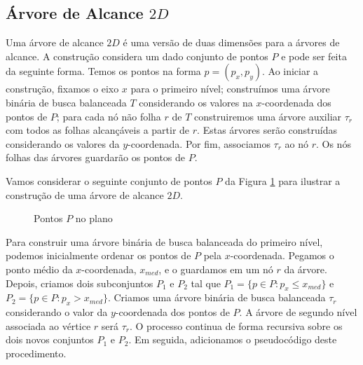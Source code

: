 \subsection{Árvore de Alcance $2D$}

Uma árvore de alcance $2D$ é uma versão de duas dimensões para a árvores de alcance. A construção considera um dado conjunto de pontos $P$ e pode ser feita da seguinte forma.
Temos os pontos na forma $p = (p_x, p_y)$. Ao iniciar a construção, fixamos o eixo $x$ para o primeiro nível; construímos uma árvore binária de busca balanceada $T$ considerando os valores na $x$-coordenada dos pontos de $P$; para cada nó não folha $r$ de $T$ construiremos uma árvore auxiliar $\tau_r$ com todos as folhas alcançáveis a partir de $r$. Estas árvores serão construídas considerando os valores da $y$-coordenada. Por fim, associamos $\tau_r$ ao nó $r$. Os nós folhas das árvores guardarão os pontos de $P$.

Vamos considerar o seguinte conjunto de pontos $P$ da Figura \ref{fig:9} para ilustrar a construção de uma árvore de alcance $2D$.
\begin{figure}[H]
\centering
{}
\caption{Pontos $P$ no plano}
\label{fig:9}
\end{figure}

Para construir uma árvore binária de busca balanceada do primeiro nível, podemos inicialmente ordenar os pontos de $P$ pela %
$x$-coordenada. %
Pegamos o ponto médio da $x$-coordenada, $x_{med}$, e o guardamos em um nó $r$ da árvore. Depois, criamos dois subconjuntos $P_1$ e $P_2$ tal que $P_1 = \{p \in P : p_x \leq x_{med}\}$ e $P_2 = \{p \in P : p_x > x_{med}\}$. Criamos uma árvore binária de busca balanceada $\tau_r$ considerando o valor da $y$-coordenada dos pontos de $P$. A árvore de segundo nível associada ao vértice $r$ será $\tau_r$. O processo continua de forma recursiva sobre os dois novos conjuntos $P_1$ e $P_2$. Em seguida, adicionamos o pseudocódigo deste procedimento.

